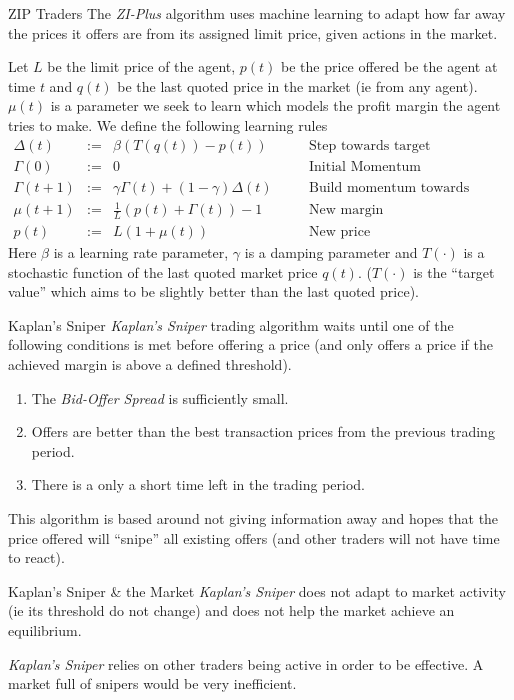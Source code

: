 \documentclass[11pt,a4paper]{article}
\begin{document}
  \begin{definition}{ZIP Traders}
    The \textit{ZI-Plus} algorithm uses machine learning to adapt how far away the prices it offers are from its assigned limit price, given actions in the market.
    \par Let $L$ be the limit price of the agent, $p(t)$ be the price offered be the agent at time $t$ and $q(t)$ be the last quoted price in the market (ie from any agent). $\mu(t)$ is a parameter we seek to learn which models the profit margin the agent tries to make. We define the following learning rules
    \[\begin{array}{rclll}
      \Delta(t)&:=&\beta(T(q(t))-p(t))&\quad&\text{Step towards target}\\
      \Gamma(0)&:=&0&&\text{Initial Momentum}\\
      \Gamma(t+1)&:=&\gamma\Gamma(t)+(1-\gamma)\Delta(t)&&\text{Build momentum towards target}\\
      \mu(t+1)&:=&\frac1L(p(t)+\Gamma(t))-1&&\text{New margin}\\
      p(t)&:=&L(1+\mu(t))&&\text{New price}
    \end{array}\]
    Here $\beta$ is a learning rate parameter, $\gamma$ is a damping parameter and $T(\cdot)$ is a stochastic function of the last quoted market price $q(t)$. ($T(\cdot)$ is the ``target value'' which aims to be slightly better than the last quoted price).
  \end{definition}

  \begin{definition}{Kaplan's Sniper}
    \textit{Kaplan's Sniper} trading algorithm waits until one of the following conditions is met before offering a price (and only offers a price if the achieved margin is above a defined threshold).
    \begin{enumerate}
      \item The \textit{Bid-Offer Spread} is sufficiently small.
      \item Offers are better than the best transaction prices from the previous trading period.
      \item There is a only a short time left in the trading period.
    \end{enumerate}
    This algorithm is based around not giving information away and hopes that the price offered will ``snipe'' all existing offers (and other traders will not have time to react).
  \end{definition}

  \begin{remark}{Kaplan's Sniper \& the Market}
    \textit{Kaplan's Sniper} does not adapt to market activity (ie its threshold do not change) and does not help the market achieve an equilibrium.
    \par \textit{Kaplan's Sniper} relies on other traders being active in order to be effective. A market full of snipers would be very inefficient.
  \end{remark}
\end{document}

